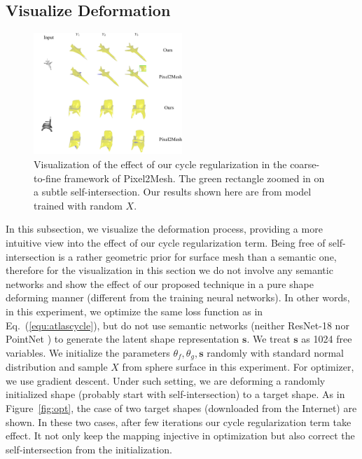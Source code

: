 \subsection{Visualize Deformation}
\label{subsec:deform}
\begin{figure}
	\begin{center}
		\includegraphics[width=0.5\textwidth]{img/p2m/3level}
	\end{center}
	\caption{Visualization of the effect of our cycle regularization in the coarse-to-fine framework of Pixel2Mesh. The green rectangle zoomed in on a subtle self-intersection. Our results shown here are from model trained with random $X$.}
	\label{fig:3level}
\end{figure}
In this subsection, we visualize the deformation process, providing a more intuitive view into the effect of our cycle regularization term. Being free of self-intersection is a rather geometric prior for surface mesh than a semantic one, therefore for the visualization in this section we do not involve any semantic networks and show the effect of our proposed technique in a pure shape deforming manner (different from the training neural networks). In other words, in this experiment, we optimize the same loss function as in Eq.~(\ref{equ:atlascycle}), but do not use semantic networks (neither ResNet-18 \cite{resnet} nor PointNet \cite{pointnet}) to generate the latent shape representation $\mathbf{s}$. We treat $\mathbf{s}$ as 1024 free variables. We initialize the parameters $\theta_f,\theta_g,\mathbf{s}$ randomly with standard normal distribution and sample $X$ from sphere surface in this experiment. For optimizer, we use gradient descent. Under such setting, we are deforming a randomly initialized shape (probably start with self-intersection) to a target shape. As in Figure~\ref{fig:opt}, the case of two target shapes (downloaded from the Internet) are shown. In these two cases, after few iterations our cycle regularization term take effect. It not only keep the mapping injective in optimization but also correct the self-intersection from the initialization.

